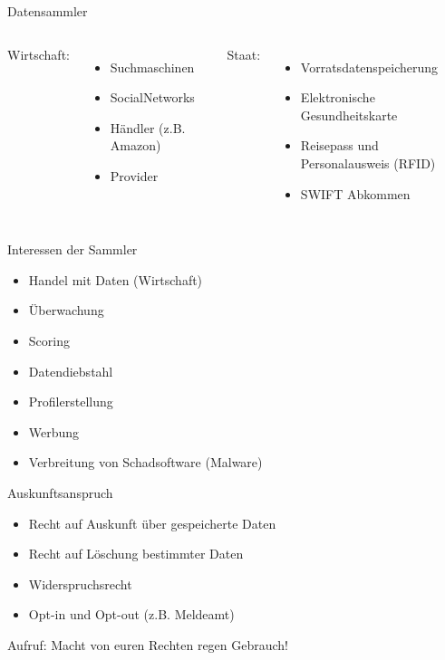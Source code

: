 \begin{frame}{Datensammler}
	\begin{columns}
			Wirtschaft:
			\begin{itemize}
				\item Suchmaschinen
				\item SocialNetworks
				\item H\"andler (z.B. Amazon)
				\item Provider
			\end{itemize}
			Staat:
			\begin{itemize}
				\item Vorratsdatenspeicherung
				\item Elektronische Gesundheitskarte
				\item Reisepass und Personalausweis (RFID)
				\item SWIFT Abkommen
			\end{itemize}
	\end{columns}
\end{frame}
\begin{frame}{Interessen der Sammler}
	\begin{itemize}
		\item Handel mit Daten (Wirtschaft)
		\item \"Uberwachung
		\item Scoring
		\item Datendiebstahl
		\item Profilerstellung
		\item Werbung
		\item Verbreitung von Schadsoftware (Malware)
	\end{itemize}
\end{frame}
\begin{frame}{Auskunftsanspruch}
	\begin{itemize}
		\item Recht auf Auskunft \"uber gespeicherte Daten
		\item Recht auf L\"oschung bestimmter Daten
		\item Widerspruchsrecht
		\item Opt-in und Opt-out (z.B. Meldeamt)
	\end{itemize}
	\begin{block}{Aufruf:}
		Macht von euren Rechten regen Gebrauch!
	\end{block}
\end{frame}




